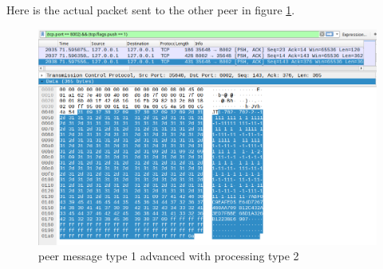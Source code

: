 Here is the actual packet sent to the other peer in figure \ref{fig:sync7}.
\begin{figure}[!h]
	\centering
	\includegraphics[width=1\textwidth]{Figures/sync7.png}
	\caption[peer message type 1 advanced with processing type 2]{peer message type 1 advanced with processing type 2}
	\label{fig:sync7}
\end{figure}
\FloatBarrier

